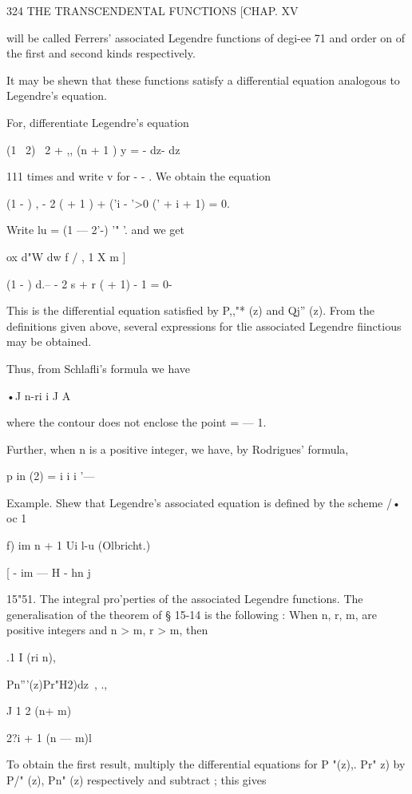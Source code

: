 {{{324 THE TRANSCENDENTAL FUNCTIONS [CHAP. XV 

will be called Ferrers' associated Legendre functions of degi-ee 71 and order on 
of the first and second kinds respectively. 

It may be shewn that these functions satisfy a differential equation 
analogous to Legendre's equation. 

For, differentiate Legendre's equation 

(1 \   2)   \  2  + ,, (n + 1 ) y = 
  -  dz- dz 

111 times and write v for - -  . We obtain the equation 

(1 -  )  , - 2  (   + 1 )   + ('i - '>0 ('  +  i + 1)   = 0. 

Write lu = (1 — 2'-) '"  '. and we get 

ox d"W   dw f / , 1 X m  ] 

(1 -   ) d.-- - 2  s + r (  + 1) - 1     = 0- 

This is the differential equation satisfied by P,,"* (z) and Qj'' (z). 
From the definitions given above, several expressions for tlie associated Legendre 
fiinctious may be obtained. 

Thus, from Schlafli's formula we have 

•J n-ri  i J A 

where the contour does not enclose the point  = — 1. 

Further, when n is a positive integer, we have, by Rodrigues' formula, 

p in (2) = i i i '— 

Example. Shew that Legendre's associated equation is defined by the scheme 
/• oc 1   

f) im n + 1 Ui l-u  (Olbricht.) 

[ - im — H - hn j 

15"51. The integral pro'perties of the associated Legendre functions. 
The generalisation of the theorem of § 15-14 is the following : 
When n, r, m, are positive integers and n > m, r > m, then 



.1 I (ri n), 

Pn'''(z)Pr"H2)dz\   , ., 

J 1 2 (n+ m)\ 



2?i + 1 (n — m)l 

To obtain the first result, multiply the differential equations for P  "(z),. 
Pr"   z) by P/" (z), Pn"  (z) respectively and subtract ; this gives 

}}}

